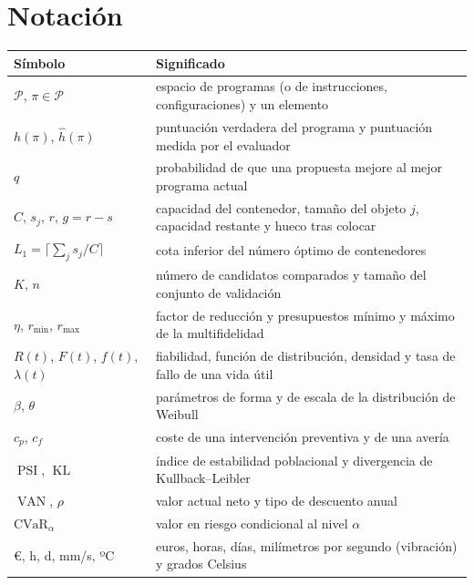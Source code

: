 \documentclass[11pt,a4paper,twoside,openany]{book}
\DeclareMathOperator{\VAN}{VAN}
\DeclareMathOperator{\PSI}{PSI}
\DeclareMathOperator{\KL}{KL}
\newcommand{\Prog}{\mathcal{P}}
\begin{document}
\section*{Notación}
\begin{center}\small
\begin{tabularx}{\textwidth}{@{}l>{\raggedright\arraybackslash}X@{}}
\toprule
Símbolo & Significado \\
\midrule
$\Prog$, $\pi\in\Prog$ & espacio de programas (o de instrucciones, configuraciones) y un elemento \\
$h(\pi)$, $\hat h(\pi)$ & puntuación verdadera del programa y puntuación medida por el evaluador \\
$q$ & probabilidad de que una propuesta mejore al mejor programa actual \\
$C$, $s_j$, $r$, $g=r-s$ & capacidad del contenedor, tamaño del objeto $j$, capacidad restante y hueco tras colocar \\
$L_1=\lceil\sum_j s_j/C\rceil$ & cota inferior del número óptimo de contenedores \\
$K$, $n$ & número de candidatos comparados y tamaño del conjunto de validación \\
$\eta$, $r_{\min}$, $r_{\max}$ & factor de reducción y presupuestos mínimo y máximo de la multifidelidad \\
$R(t)$, $F(t)$, $f(t)$, $\lambda(t)$ & fiabilidad, función de distribución, densidad y tasa de fallo de una vida útil \\
$\beta$, $\theta$ & parámetros de forma y de escala de la distribución de Weibull \\
$c_p$, $c_f$ & coste de una intervención preventiva y de una avería \\
$\PSI$, $\KL$ & índice de estabilidad poblacional y divergencia de Kullback--Leibler \\
$\VAN$, $\rho$ & valor actual neto y tipo de descuento anual \\
$\mathrm{CVaR}_\alpha$ & valor en riesgo condicional al nivel $\alpha$ \\
€, h, d, mm/s, ºC & euros, horas, días, milímetros por segundo (vibración) y grados Celsius \\
\bottomrule
\end{tabularx}
\end{center}

\tableofcontents

\mainmatter







\appendix


\backmatter

\end{document}
